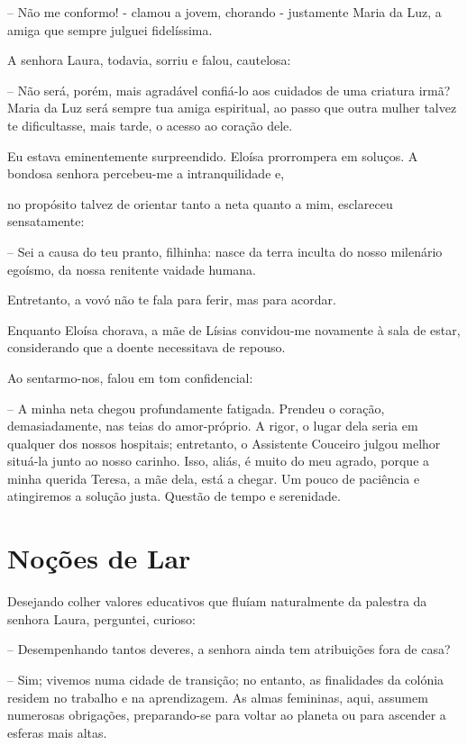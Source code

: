 \documentclass[portuguese,12pt,a4paper]{scrbook}
\begin{document}
	– Não me conformo! - clamou a jovem, chorando - justamente Maria da Luz, a amiga que sempre julguei fidelíssima.
	
	A senhora Laura, todavia, sorriu e falou, cautelosa:
	
	– Não será, porém, mais agradável confiá-lo aos cuidados de uma criatura irmã? Maria da Luz será sempre tua amiga espiritual, ao passo que outra mulher talvez te dificultasse, mais tarde, o acesso ao coração dele.
	
	Eu estava eminentemente surpreendido. Eloísa prorrompera em soluços. A bondosa senhora percebeu-me a intranquilidade e,
	
	
	no propósito talvez de orientar tanto a neta quanto a mim, esclareceu sensatamente:
	
	– Sei a causa do teu pranto, filhinha: nasce da terra inculta do nosso milenário egoísmo, da nossa renitente vaidade humana.
	
	Entretanto, a vovó não te fala para ferir, mas para acordar.
	
	Enquanto Eloísa chorava, a mãe de Lísias convidou-me novamente à sala de estar, considerando que a doente necessitava de repouso.
	
	Ao sentarmo-nos, falou em tom confidencial:
	
	– A minha neta chegou profundamente fatigada. Prendeu o coração, demasiadamente, nas teias do amor-próprio. A rigor, o lugar dela seria em qualquer dos nossos hospitais; entretanto, o Assistente Couceiro julgou melhor situá-la junto ao nosso carinho. Isso, aliás, é muito do meu agrado, porque a minha querida Teresa, a mãe dela, está a chegar. Um pouco de paciência e atingiremos a solução justa. Questão de tempo e serenidade.
	
	
	\chapter{Noções de Lar}
	
	Desejando colher valores educativos que fluíam naturalmente da palestra da senhora Laura, perguntei, curioso:
	
	– Desempenhando tantos deveres, a senhora ainda tem atribuições fora de casa?
	
	– Sim; vivemos numa cidade de transição; no entanto, as finalidades da colónia residem no trabalho e na aprendizagem. As almas femininas, aqui, assumem numerosas obrigações, preparando-se para voltar ao planeta ou para ascender a esferas mais altas.
	
\end{document}
